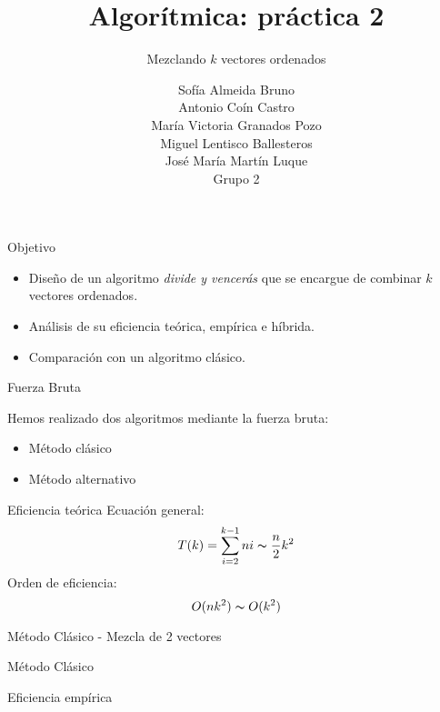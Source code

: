 \documentclass[spanish]{beamer}
\title{Algorítmica: práctica 2}
\subtitle{Mezclando $k$ vectores ordenados}
\author{Sofía Almeida Bruno\\ Antonio Coín Castro\\ María Victoria Granados Pozo\\ Miguel Lentisco Ballesteros\\ José María Martín Luque\\ \vspace{1em}Grupo 2}
\begin{document}
\maketitle

\begin{frame}{Objetivo}

	\begin{itemize}
		\item Diseño de un algoritmo \textit{divide y vencerás} que se encargue de combinar $k$ vectores ordenados. 
		\item Análisis de su eficiencia teórica, empírica e híbrida.
		\item Comparación con un algoritmo clásico.
	\end{itemize}

\end{frame}

\begin{frame}{Fuerza Bruta}

	Hemos realizado dos algoritmos mediante la fuerza bruta:
	\begin{itemize}
		\item Método clásico
		\item Método alternativo
	\end{itemize}
\end{frame}

\begin{frame}{Eficiencia teórica}
	Ecuación general: $$T(k) = \sum_{i=2}^{k-1} ni \thicksim \frac{n}{2}k^2$$
	Orden de eficiencia: $$O(nk^2) \thicksim O(k^2) $$

\end{frame}

\begin{frame}{Método Clásico - Mezcla de 2 vectores}

	
\end{frame}

\begin{frame}{Método Clásico}
	
\end{frame}

\begin{frame}{Eficiencia empírica}
	\begin{center}
		\resizebox*{11cm}{!}{
			}
	\end{center}

\end{frame}
\end{document}
